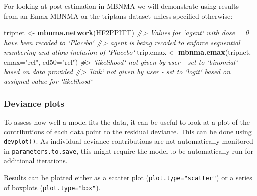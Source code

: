 \documentclass[]{article}
\newenvironment{Shaded}{\begin{snugshade}}{\end{snugshade}}
\newcommand{\CommentTok}[1]{\textcolor[rgb]{0.56,0.35,0.01}{\textit{#1}}}
\newcommand{\DataTypeTok}[1]{\textcolor[rgb]{0.13,0.29,0.53}{#1}}
\newcommand{\KeywordTok}[1]{\textcolor[rgb]{0.13,0.29,0.53}{\textbf{#1}}}
\newcommand{\NormalTok}[1]{#1}
\newcommand{\StringTok}[1]{\textcolor[rgb]{0.31,0.60,0.02}{#1}}
\begin{document}
For looking at post-estimation in MBNMA we will demonstrate using
results from an Emax MBNMA on the triptans dataset unless specified
otherwise:

\begin{Shaded}
\begin{Highlighting}[]
\NormalTok{tripnet <-}\StringTok{ }\KeywordTok{mbnma.network}\NormalTok{(HF2PPITT)}
\CommentTok{#> Values for `agent` with dose = 0 have been recoded to `Placebo`}
\CommentTok{#> agent is being recoded to enforce sequential numbering and allow inclusion of `Placebo`}
\NormalTok{trip.emax <-}\StringTok{ }\KeywordTok{mbnma.emax}\NormalTok{(tripnet, }\DataTypeTok{emax=}\StringTok{"rel"}\NormalTok{, }\DataTypeTok{ed50=}\StringTok{"rel"}\NormalTok{) }
\CommentTok{#> `likelihood` not given by user - set to `binomial` based on data provided}
\CommentTok{#> `link` not given by user - set to `logit` based on assigned value for `likelihood`}
\end{Highlighting}
\end{Shaded}

\hypertarget{deviance-plots}{%
\subsubsection{Deviance plots}\label{deviance-plots}}

To assess how well a model fits the data, it can be useful to look at a
plot of the contributions of each data point to the residual deviance.
This can be done using \texttt{devplot()}. As individual deviance
contributions are not automatically monitored in
\texttt{parameters.to.save}, this might require the model to be
automatically run for additional iterations.

Results can be plotted either as a scatter plot
(\texttt{plot.type="scatter"}) or a series of boxplots
(\texttt{plot.type="box"}).

\begin{Shaded}
\end{Shaded}
\end{document}
